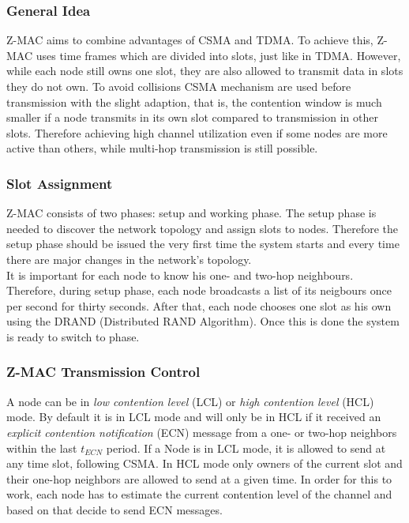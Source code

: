 \subsubsection{General Idea}
Z-MAC aims to combine advantages of CSMA and TDMA. To achieve this, Z-MAC uses time frames which are divided into slots, just like in TDMA. However, while each node still owns one slot, they are also allowed to transmit data in slots they do not own. To avoid collisions CSMA mechanism are used before transmission with the slight adaption, that is, the contention window is much smaller if a node transmits in its own slot compared to transmission in other slots. Therefore achieving high channel utilization even if some nodes are more active than others, while multi-hop transmission is still possible.\cite{rhee2008z}

\subsubsection{Slot Assignment}
Z-MAC consists of two phases: setup and working phase. The setup phase is needed to discover the network topology and assign slots to nodes. Therefore the setup phase should be issued the very first time the system starts and every time there are major changes in the network's topology.\\
It is important for each node to know his one- and two-hop neighbours. Therefore, during setup phase, each node broadcasts a list of its neigbours once per second for thirty seconds. After that, each node chooses one slot as his own using the DRAND (Distributed RAND Algorithm). Once this is done the system is ready to switch to
phase.

\subsubsection{Z-MAC Transmission Control}
A node can be in \textit{low contention level} (LCL) or \textit{high contention level} (HCL) mode. By default it is in LCL mode and will only be in HCL if it received an \textit{explicit contention notification} (ECN) message from a one- or two-hop neighbors within the last $t_{ECN}$ period. If a Node is in LCL mode, it is allowed to send at any time slot, following CSMA. In HCL mode only owners of the current slot and their one-hop neighbors are allowed to send at a given time. In order for this to work, each node has to estimate the current contention level of the channel and based on that decide to send ECN messages.

